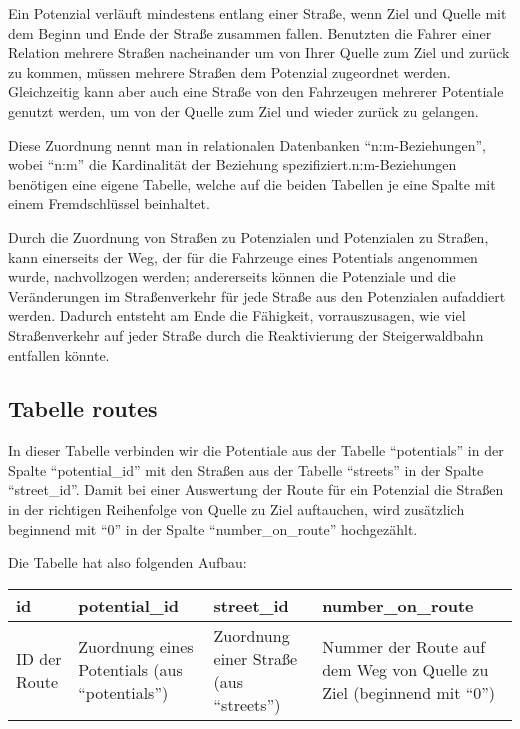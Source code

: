 \documentclass[fontsize=12pt,a4paper]{scrreprt}
\begin{document}
Ein Potenzial verläuft mindestens entlang einer Straße, wenn Ziel und Quelle mit dem Beginn und Ende der Straße zusammen fallen. Benutzten die Fahrer einer Relation mehrere Straßen nacheinander um von Ihrer Quelle zum Ziel und zurück zu kommen, müssen mehrere Straßen dem Potenzial zugeordnet werden. Gleichzeitig kann aber auch eine Straße von den Fahrzeugen mehrerer Potentiale genutzt werden, um von der Quelle zum Ziel und wieder zurück zu gelangen.

\vspace{1em}

Diese Zuordnung nennt man in relationalen Datenbanken \enquote{n:m-Beziehungen}, wobei \enquote{n:m} die Kardinalität der Beziehung spezifiziert.\@ n:m-Beziehungen benötigen eine eigene Tabelle, welche auf die beiden Tabellen je eine Spalte mit einem Fremdschlüssel beinhaltet.

\vspace{1em}

Durch die Zuordnung von Straßen zu Potenzialen und Potenzialen zu Straßen, kann einerseits der Weg, der für die Fahrzeuge eines Potentials angenommen wurde, nachvollzogen werden; andererseits können die Potenziale und die Veränderungen im Straßenverkehr für jede Straße aus den Potenzialen aufaddiert werden. Dadurch entsteht am Ende die Fähigkeit, vorrauszusagen, wie viel Straßenverkehr auf jeder Straße durch die Reaktivierung der Steigerwaldbahn entfallen könnte.

\subsection{Tabelle routes}

In dieser Tabelle verbinden wir die Potentiale aus der Tabelle \enquote{potentials} in der Spalte \enquote{potential_id} mit den Straßen aus der Tabelle \enquote{streets} in der Spalte \enquote{street_id}. Damit bei einer Auswertung der Route für ein Potenzial die Straßen in der richtigen Reihenfolge von Quelle zu Ziel auftauchen, wird zusätzlich beginnend mit \enquote{0} in der Spalte \enquote{number_on_route} hochgezählt.

Die Tabelle hat also folgenden Aufbau:

\begin{table}[H]
        \begin{tabu}{*4{|X[l]}|}
                \hline
                id           & potential_id                                          & street_id                                      & number_on_route                                                             \\
                \hline
                ID der Route & Zuordnung eines Potentials (aus \enquote{potentials}) & Zuordnung einer Straße (aus \enquote{streets}) & Nummer der Route auf dem Weg von Quelle zu Ziel (beginnend mit \enquote{0}) \\
                \hline
        \end{tabu}
\end{table}
\end{document}
